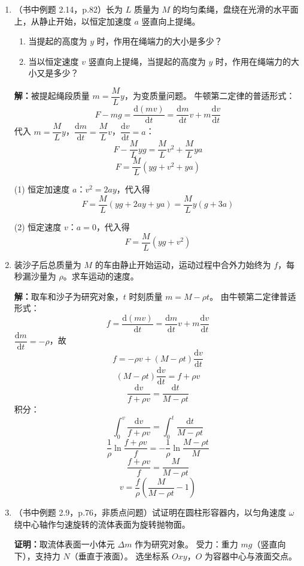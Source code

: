 \documentclass{ctexart}
\begin{document}
\begin{enumerate}
\item（书中例题 2.14，p.82）长为 $L$ 质量为 $M$ 的均匀柔绳，盘绕在光滑的水平面上，从静止开始，以恒定加速度 $a$ 竖直向上提绳。
\begin{enumerate}
  \item 当提起的高度为 $y$ 时，作用在绳端力的大小是多少？
  \item 当以恒定速度 $v$ 竖直向上提绳，当提起的高度为 $y$ 时，作用在绳端力的大小又是多少？
\end{enumerate}

\textbf{解：}被提起绳段质量 $m = \dfrac{M}{L}y$，为变质量问题。
牛顿第二定律的普适形式：
\[
F - mg = \frac{\mathrm{d}(mv)}{\mathrm{d}t} = \frac{\mathrm{d}m}{\mathrm{d}t}v + m\frac{\mathrm{d}v}{\mathrm{d}t}
\]
代入 $m = \dfrac{M}{L}y$，$\dfrac{\mathrm{d}m}{\mathrm{d}t} = \dfrac{M}{L}v$，$\dfrac{\mathrm{d}v}{\mathrm{d}t} = a$：
\[
F - \frac{M}{L}yg = \frac{M}{L}v^{2} + \frac{M}{L}ya
\]
\[
F = \frac{M}{L}(yg + v^{2} + ya)
\]

(1) 恒定加速度 $a$：$v^{2} = 2ay$，代入得
\[
F = \frac{M}{L}(yg + 2ay + ya) = \frac{M}{L}y(g + 3a)
\]

(2) 恒定速度 $v$：$a = 0$，代入得
\[
F = \frac{M}{L}(yg + v^{2})
\]

\item 装沙子后总质量为 $M$ 的车由静止开始运动，运动过程中合外力始终为 $f$，每秒漏沙量为 $\rho$。求车运动的速度。

\textbf{解：}取车和沙子为研究对象，$t$ 时刻质量 $m = M - \rho t$。
由牛顿第二定律普适形式：
\[
f = \frac{\mathrm{d}(mv)}{\mathrm{d}t} = \frac{\mathrm{d}m}{\mathrm{d}t}v + m\frac{\mathrm{d}v}{\mathrm{d}t}
\]
$\dfrac{\mathrm{d}m}{\mathrm{d}t} = -\rho$，故
\[
f = -\rho v + (M - \rho t)\frac{\mathrm{d}v}{\mathrm{d}t}
\]
\[
(M - \rho t)\frac{\mathrm{d}v}{\mathrm{d}t} = f + \rho v
\]
\[
\frac{\mathrm{d}v}{f + \rho v} = \frac{\mathrm{d}t}{M - \rho t}
\]
积分：
\[
\int_{0}^{v} \frac{\mathrm{d}v}{f + \rho v} = \int_{0}^{t} \frac{\mathrm{d}t}{M - \rho t}
\]
\[
\frac{1}{\rho}\ln\frac{f + \rho v}{f} = -\frac{1}{\rho}\ln\frac{M - \rho t}{M}
\]
\[
\frac{f + \rho v}{f} = \frac{M}{M - \rho t}
\]
\[
v = \frac{f}{\rho}\left(\frac{M}{M - \rho t} - 1\right)
\]

\item（书中例题 2.9，p.76，非质点问题）试证明在圆柱形容器内，以匀角速度 $\omega$ 绕中心轴作匀速旋转的流体表面为旋转抛物面。

\textbf{证明：}取流体表面一小体元 $\Delta m$ 作为研究对象。
受力：重力 $mg$（竖直向下），支持力 $N$（垂直于液面）。
选坐标系 $Oxy$，$O$ 为容器中心与液面交点。


\end{enumerate}
\end{document}
